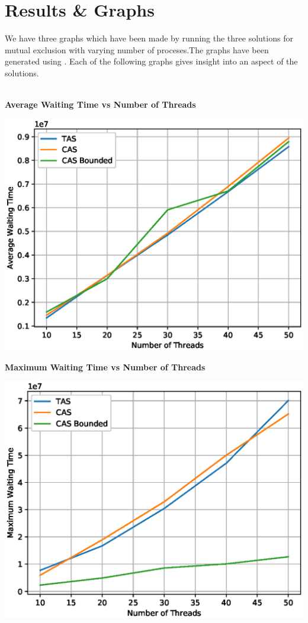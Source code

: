 \documentclass[a4paper,12pt]{report}
\begin{document}
\section{Results \& Graphs}
We have three graphs which have been made by running the three solutions for mutual exclusion with varying number of proceses.The graphs have been generated using . Each of the following graphs gives insight into an aspect of the solutions.\\\\
\begin{center}
\begin{large}
\textbf{Average Waiting Time vs Number of Threads}
\end{large}
\includegraphics{avg.eps}
\end{center}
\begin{center}
\begin{large}
\textbf{Maximum Waiting Time vs Number of Threads}
\end{large}
\includegraphics{max.eps}
\end{center}
\end{document}
